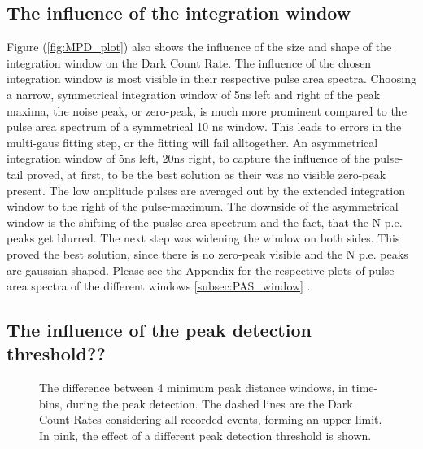 \documentclass[article,type=msc,colorback,accentcolor=tud9c]{tudthesis}
\begin{document}
\subsection{The influence of the integration window}
Figure (\ref{fig:MPD_plot}) also shows the influence of the size and shape of the integration window on the Dark Count Rate. The influence of the chosen integration window is most visible in their respective pulse area spectra. Choosing a narrow, symmetrical integration window of 5ns left and right of the peak maxima, the noise peak, or zero-peak, is much more prominent compared to the pulse area spectrum of a symmetrical 10 ns window. This leads to errors in the multi-gaus fitting step, or the fitting will fail alltogether. An asymmetrical integration window of 5ns left, 20ns right, to capture the influence of the pulse-tail proved, at first, to be the best solution as their was no visible zero-peak present. The low amplitude pulses are averaged out by the extended integration window to the right of the pulse-maximum. The downside of the asymmetrical window is the shifting of the puslse area spectrum and the fact, that the N p.e. peaks get blurred. The next step was widening the window on both sides. This proved the best solution, since there is no zero-peak visible and the N p.e. peaks are gaussian shaped. Please see the Appendix for the respective plots of pulse area spectra of the different windows \ref{subsec:PAS_window} .
\subsection{The influence of the peak detection threshold??}
\begin{figure}[h]
\begin{centering}
\caption{The difference between 4 minimum peak distance windows, in time-bins, during the peak detection. The dashed lines are the Dark Count Rates considering all recorded events, forming an upper limit. In pink, the effect of a different peak detection threshold is shown.}
\label{fig:PF_Thresh_plot}
\end{centering}
\end{figure}
\end{document}
